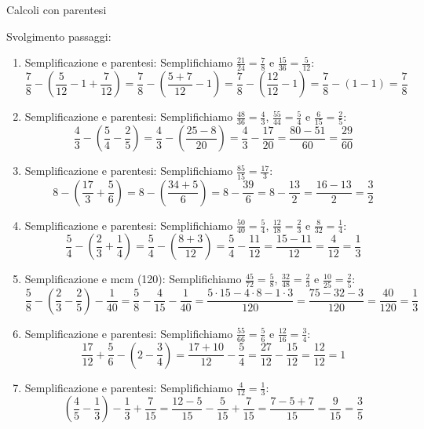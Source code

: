 \begin{esercizio}{Calcoli con parentesi}
\begin{soluzione}
  Svolgimento passaggi:
  \begin{enumerate}[label=\alph*)]
    \item Semplificazione e parentesi: Semplifichiamo $\frac{21}{24} = \frac{7}{8}$ e $\frac{15}{36} = \frac{5}{12}$:
      \[
      \frac{7}{8} - \left(\frac{5}{12} - 1 + \frac{7}{12}\right) = \frac{7}{8} - \left(\frac{5+7}{12} - 1\right) = \frac{7}{8} - \left(\frac{12}{12} - 1\right) = \frac{7}{8} - (1-1) = \frac{7}{8}
      \]
    \item Semplificazione e parentesi: Semplifichiamo $\frac{48}{36} = \frac{4}{3}$, $\frac{55}{44} = \frac{5}{4}$ e $\frac{6}{15} = \frac{2}{5}$:
      \[
      \frac{4}{3} - \left(\frac{5}{4} - \frac{2}{5}\right) = \frac{4}{3} - \left(\frac{25-8}{20}\right) = \frac{4}{3} - \frac{17}{20} = \frac{80-51}{60} = \frac{29}{60}
      \]
    \item Semplificazione e parentesi: Semplifichiamo $\frac{85}{15} = \frac{17}{3}$:
      \[
      8 - \left(\frac{17}{3} + \frac{5}{6}\right) = 8 - \left(\frac{34+5}{6}\right) = 8 - \frac{39}{6} = 8 - \frac{13}{2} = \frac{16-13}{2} = \frac{3}{2}
      \]
    \item Semplificazione e parentesi: Semplifichiamo $\frac{50}{40} = \frac{5}{4}$, $\frac{12}{18} = \frac{2}{3}$ e $\frac{8}{32} = \frac{1}{4}$:
      \[
      \frac{5}{4} - \left(\frac{2}{3} + \frac{1}{4}\right) = \frac{5}{4} - \left(\frac{8+3}{12}\right) = \frac{5}{4} - \frac{11}{12} = \frac{15-11}{12} = \frac{4}{12} = \frac{1}{3}
      \]
    \item Semplificazione e mcm (120): Semplifichiamo $\frac{45}{72} = \frac{5}{8}$, $\frac{32}{48} = \frac{2}{3}$ e $\frac{10}{25} = \frac{2}{5}$:
      \[
      \frac{5}{8} - \left(\frac{2}{3} - \frac{2}{5}\right) - \frac{1}{40} = \frac{5}{8} - \frac{4}{15} - \frac{1}{40} = \frac{5 \cdot 15 - 4 \cdot 8 - 1 \cdot 3}{120} = \frac{75 - 32 - 3}{120} = \frac{40}{120} = \frac{1}{3}
      \]
    \item Semplificazione e parentesi: Semplifichiamo $\frac{55}{66} = \frac{5}{6}$ e $\frac{12}{16} = \frac{3}{4}$:
      \[
      \frac{17}{12} + \frac{5}{6} - \left(2 - \frac{3}{4}\right) = \frac{17+10}{12} - \frac{5}{4} = \frac{27}{12} - \frac{15}{12} = \frac{12}{12} = 1
      \]
    \item Semplificazione e parentesi: Semplifichiamo $\frac{4}{12} = \frac{1}{3}$:
      \[
      \left(\frac{4}{5} - \frac{1}{3}\right) - \frac{1}{3} + \frac{7}{15} = \frac{12-5}{15} - \frac{5}{15} + \frac{7}{15} = \frac{7-5+7}{15} = \frac{9}{15} = \frac{3}{5}
      \]
  \end{enumerate}
\end{soluzione}
\end{esercizio}

